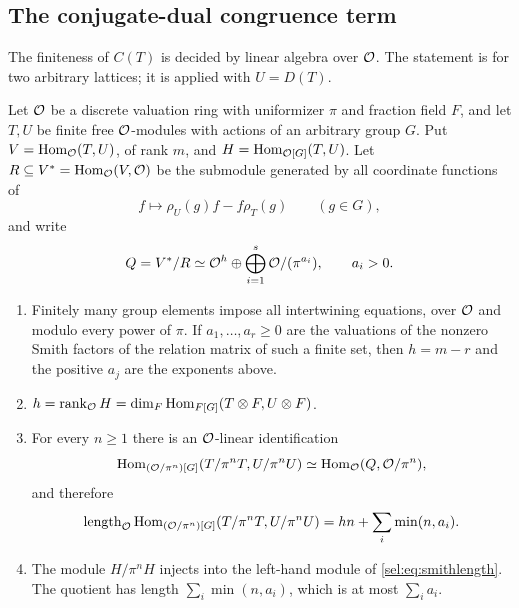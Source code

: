 \subsection{The conjugate-dual congruence term}\label{sel:sec:congruence}

The finiteness of $C(T)$ is decided by linear algebra over $\mathcal{O}$. The
statement is for two arbitrary lattices; it is applied with $U=D(T)$.

\begin{theorem}\label{sel:thm:smith}
Let $\mathcal{O}$ be a discrete valuation ring with uniformizer $\pi$ and fraction
field $F$, and let $T,U$ be finite free $\mathcal{O}$-modules with actions of an
arbitrary group $G$. Put $V=\operatorname{Hom}_{\mathcal{O}}(T,U)$, of rank $m$, and
$H=\operatorname{Hom}_{\mathcal{O}[G]}(T,U)$. Let $R\subseteq V^*=\operatorname{Hom}_{\mathcal{O}}(V,\mathcal{O})$ be the
submodule generated by all coordinate functions of
\[
 f\longmapsto\rho_U(g)f-f\rho_T(g)\qquad(g\in G),
\]
and write
\[
 Q=V^*/R\simeq\mathcal{O}^{h}\oplus\bigoplus_{i=1}^{s}\mathcal{O}/(\pi^{a_i}),\qquad a_i>0.
\]
\begin{enumerate}[label=\textup{(\roman*)}]
\item Finitely many group elements impose all intertwining equations, over
$\mathcal{O}$ and modulo every power of $\pi$. If $a_1,\dots,a_r\ge0$ are the
valuations of the nonzero Smith factors of the relation matrix of such a
finite set, then $h=m-r$ and the positive $a_j$ are the exponents above.
\item $h=\operatorname{rank}_{\mathcal{O}}H=\dim_F\operatorname{Hom}_{F[G]}(T\otimes F,U\otimes F)$.
\item For every $n\ge1$ there is an $\mathcal{O}$-linear identification
\[
 \operatorname{Hom}_{(\mathcal{O}/\pi^n)[G]}(T/\pi^nT,U/\pi^nU)\simeq\operatorname{Hom}_{\mathcal{O}}(Q,\mathcal{O}/\pi^n),
\]
and therefore
\begin{equation}\label{sel:eq:smithlength}
 \operatorname{length}_{\mathcal{O}}\operatorname{Hom}_{(\mathcal{O}/\pi^n)[G]}(T/\pi^nT,U/\pi^nU)
 =hn+\sum_{i}\min(n,a_i).
\end{equation}
\item The module $H/\pi^nH$ injects into the left-hand module of
\eqref{sel:eq:smithlength}. The quotient has length $\sum_i\min(n,a_i)$,
which is at most $\sum_ia_i$.
\end{enumerate}
\end{theorem}


